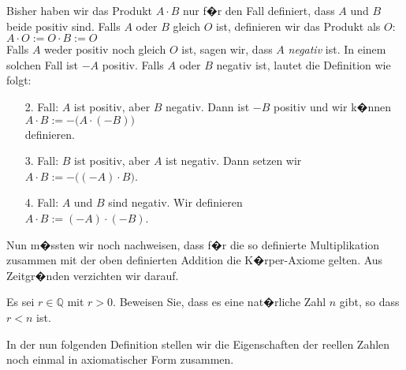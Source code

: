 \renewcommand{\labelenumi}{\arabic{enumi}.}
Bisher haben wir das Produkt $A \cdot B$ nur f�r den Fall definiert, dass $A$ und $B$ beide positiv
sind.  Falls $A$ oder $B$ gleich $O$ ist, definieren wir das Produkt als $O$:
\\[0.2cm]
\hspace*{1.3cm}
$A \cdot O := O \cdot B := O$
\\[0.2cm]
Falls $A$ weder positiv noch gleich $O$ ist, sagen wir, dass $A$  \emph{negativ} ist.  In einem
solchen Fall ist $-\!A$ positiv.  Falls $A$ oder $B$ negativ ist, lautet die Definition wie folgt:
\begin{enumerate}
\item[2.] Fall: $A$ ist positiv, aber $B$ negativ.  Dann ist $-\!B$ positiv und wir k�nnen
          \\[0.2cm]
          \hspace*{1.3cm}
          $A \cdot B := -\!\bigl(A \cdot (-\!B)\bigr)$
          \\[0.2cm]
          definieren.
\item[3.] Fall: $B$ ist positiv, aber $A$ ist negativ.  Dann setzen wir
          \\[0.2cm]
          \hspace*{1.3cm}
          $A \cdot B := -\!\bigl((-\!A) \cdot B\bigr)$.
\item[4.] Fall: $A$ und $B$ sind negativ.  Wir definieren
          \\[0.2cm]
          \hspace*{1.3cm}
          $A \cdot B := (-\!A) \cdot (-\!B)$.
\end{enumerate}
Nun m�ssten wir noch nachweisen, dass f�r die so definierte Multiplikation zusammen mit der oben definierten
Addition die K�rper-Axiome gelten.  Aus Zeitgr�nden verzichten wir darauf.


\exercise
Es sei $r \in \mathbb{Q}$ mit $r > 0$.  Beweisen Sie, dass es eine nat�rliche Zahl $n$ gibt, so dass
$r < n$ ist. \eox
\vspace*{0.3cm}

\noindent
In der nun folgenden Definition stellen wir die Eigenschaften der reellen Zahlen noch einmal in
axiomatischer Form zusammen.
\pagebreak

